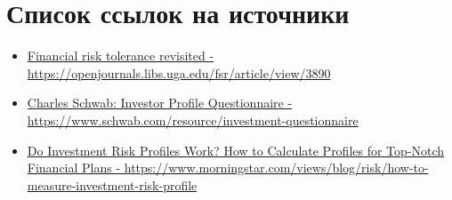 \documentclass[11pt]{article}
\providecommand{\tightlist}{%
      \setlength{\itemsep}{0pt}\setlength{\parskip}{0pt}}
\begin{document}
    \section{Список ссылок на
источники}\label{ux441ux43fux438ux441ux43eux43a-ux441ux441ux44bux43bux43eux43a-ux43dux430-ux438ux441ux442ux43eux447ux43dux438ux43aux438}

\begin{itemize}
\tightlist
\item
  \href{https://openjournals.libs.uga.edu/fsr/article/view/3890}{Financial
  risk tolerance revisited -
  https://openjournals.libs.uga.edu/fsr/article/view/3890}
\item
  \href{https://www.schwab.com/resource/investment-questionnaire}{Charles
  Schwab: Investor Profile Questionnaire -
  https://www.schwab.com/resource/investment-questionnaire}
\item
  \href{https://www.morningstar.com/views/blog/risk/how-to-measure-investment-risk-profile}{Do
  Investment Risk Profiles Work? How to Calculate Profiles for Top-Notch
  Financial Plans -
  https://www.morningstar.com/views/blog/risk/how-to-measure-investment-risk-profile}
\end{itemize}


    
    
    
\end{document}

